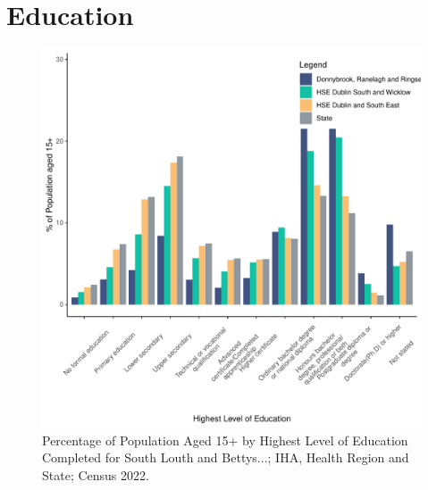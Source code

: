 \documentclass{article}
\begin{document}
\section{Education}\label{sect:Edu}
\begin{figure}[H]
	\centering
	\includegraphics[width = 120mm]{../figures/EduED.pdf}
	\caption{Percentage of Population Aged 15+ by Highest Level of Education Completed for South Louth and Bettys...; IHA, Health Region and State; Census 2022.}
	\label{fig:vbnv}
	\end{figure}
\end{document}
